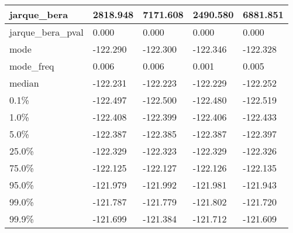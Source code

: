 \begin{table}[H]
\begin{tabular}{|l|m{10em}|m{10em}|m{10em}|m{10em}|}
\hline jarque\_bera & 2818.948 & 7171.608 & 2490.580 & 6881.851 \\
\hline jarque\_bera\_pval & 0.000 & 0.000 & 0.000 & 0.000 \\
\hline mode & -122.290 & -122.300 & -122.346 & -122.328 \\
\hline mode\_freq & 0.006 & 0.006 & 0.001 & 0.005 \\
\hline median & -122.231 & -122.223 & -122.229 & -122.252 \\
\hline 0.1\% & -122.497 & -122.500 & -122.480 & -122.519 \\
\hline 1.0\% & -122.408 & -122.399 & -122.406 & -122.433 \\
\hline 5.0\% & -122.387 & -122.385 & -122.387 & -122.397 \\
\hline 25.0\% & -122.329 & -122.323 & -122.329 & -122.326 \\
\hline 75.0\% & -122.125 & -122.127 & -122.126 & -122.135 \\
\hline 95.0\% & -121.979 & -121.992 & -121.981 & -121.943 \\
\hline 99.0\% & -121.787 & -121.779 & -121.802 & -121.720 \\
\hline 99.9\% & -121.699 & -121.384 & -121.712 & -121.609 \\
\hline
\end{tabular}
\end{table}
